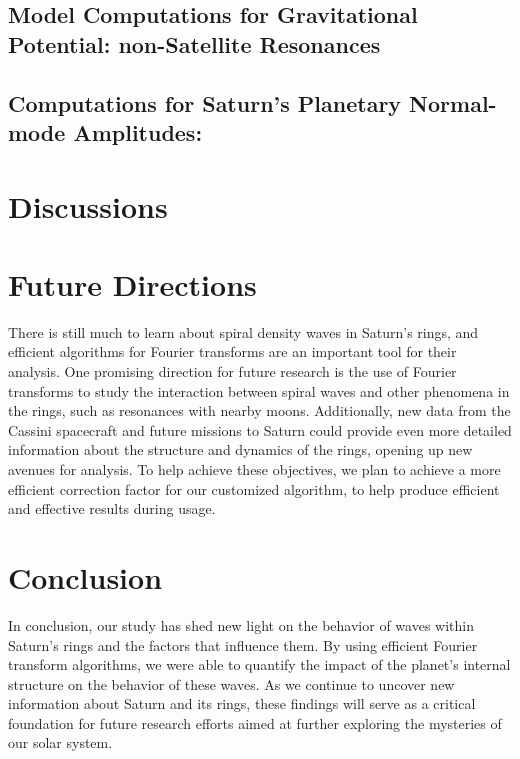 \documentclass{article}
\begin{document}
\subsection{Model Computations for Gravitational Potential: non-Satellite Resonances}
\subsection{Computations for Saturn's Planetary Normal-mode Amplitudes:}




\section{Discussions}


\section{Future Directions}
There is still much to learn about spiral density waves in Saturn's rings, and efficient algorithms for Fourier transforms are an important tool for their analysis. One promising direction for future research is the use of Fourier transforms to study the interaction between spiral waves and other phenomena in the rings, such as resonances with nearby moons. Additionally, new data from the Cassini spacecraft and future missions to Saturn could provide even more detailed information about the structure and dynamics of the rings, opening up new avenues for analysis. To help achieve these objectives, we plan to achieve a more efficient correction factor for our customized algorithm, to help produce efficient and effective results during usage. 

\section{Conclusion}
In conclusion, our study has shed new light on the behavior of waves within Saturn's rings and the factors that influence them. By using efficient Fourier transform algorithms, we were able to quantify the impact of the planet's internal structure on the behavior of these waves. As we continue to uncover new information about Saturn and its rings, these findings will serve as a critical foundation for future research efforts aimed at further exploring the mysteries of our solar system.
\end{document}
